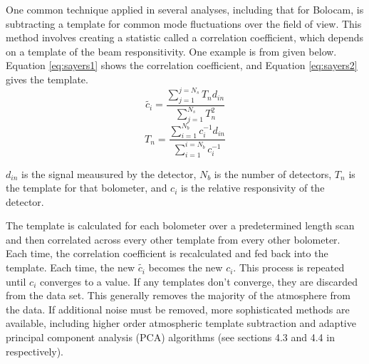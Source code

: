 \documentclass[manuscript]{aastex}
\begin{document}
One common technique applied in several analyses, including that for Bolocam, is subtracting a template for common mode fluctuations over the field of view. This method involves creating a statistic called a correlation coefficient, which depends on a template of the beam responsitivity. One example is from \cite{Sayers2010} given below. Equation \ref{eq:sayers1} shows the correlation coefficient, and Equation \ref{eq:sayers2} gives the template.
\begin{equation}\label{eq:sayers1}
    \tilde{c_{i}} = \frac{\sum_{j=1}^{j=N_{s}} T_{n}d_{in}}{\sum_{j=1}^{N_{s}} T_{n}^{2}}
\end{equation}
\begin{equation}\label{eq:sayers2}
    T_{n} = \frac{\sum_{i=1}^{N_{b}} c_{i}^{-1} d_{in}}{\sum_{i=1}^{i=N_{b}} c_{i}^{-1}}
\end{equation}

$d_{in}$ is the signal meausured by the detector, $N_{b}$ is the number of detectors, $T_{n}$ is the template for that bolometer, and $c_{i}$ is the relative responsivity of the detector.

The template is calculated for each bolometer over a predetermined length scan and then correlated across every other template from every other bolometer. Each time, the correlation coefficient is recalculated and fed back into the template. Each time, the new $\tilde{c_{i}}$ becomes the new $c_{i}$. This process is repeated until $c_{i}$ converges to a value. If any templates don't converge, they are discarded from the data set. This generally removes the majority of the atmosphere from the data. If additional noise must be removed, more sophisticated methods are available, including higher order atmospheric template subtraction and adaptive principal component analysis (PCA) algorithms (see sections 4.3 and 4.4 in \cite{Sayers2010} respectively).
\end{document}
